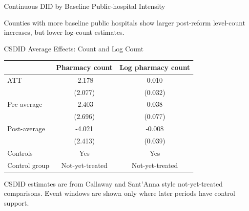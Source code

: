 \documentclass{beamer}
\begin{document}
\begin{frame}{Continuous DID by Baseline Public-hospital Intensity}

\centering
\scriptsize
\setlength{\tabcolsep}{4pt}


\vspace{0.5em}
\raggedright
\tiny Counties with more baseline public hospitals show larger post-reform level-count increases, but lower log-count estimates.

\end{frame}

\begin{frame}{CSDID Average Effects: Count and Log Count}

\centering
\scriptsize
\setlength{\tabcolsep}{7pt}

\begin{tabular}{lcc}
\toprule
& Pharmacy count & Log pharmacy count \\
\midrule
ATT
& -2.178 & 0.010 \\
& (2.077) & (0.032) \\
\addlinespace
Pre-average
& -2.403 & 0.038 \\
& (2.696) & (0.077) \\
\addlinespace
Post-average
& -4.021 & -0.008 \\
& (2.413) & (0.039) \\
\midrule
Controls & Yes & Yes \\
Control group & Not-yet-treated & Not-yet-treated \\
\bottomrule
\end{tabular}

\vspace{0.6em}
\raggedright
\tiny CSDID estimates are from Callaway and Sant'Anna style not-yet-treated comparisons. Event windows are shown only where later periods have control support.

\end{frame}
\end{document}
